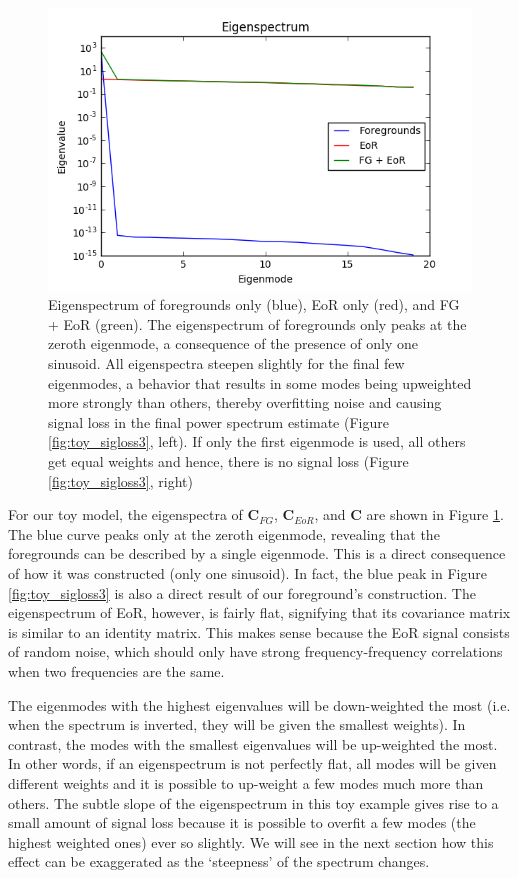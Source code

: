 \documentclass[preprint2,numberedappendix,tighten,twocolappendix]{aastex6}  %
\begin{document}
\begin{figure}
	\centering
	\includegraphics[trim={0.3cm 0.2cm 0.3cm 0.3cm},clip,width=\columnwidth]{plots/toy_sigloss2.png}
	\caption{Eigenspectrum of foregrounds only (blue), EoR only (red), and FG + EoR (green). The eigenspectrum of foregrounds only peaks at the zeroth eigenmode, a consequence of the presence of only one sinusoid. All eigenspectra steepen slightly for the final few eigenmodes, a behavior that results in some modes being upweighted more strongly than others, thereby overfitting noise and causing signal loss in the final power spectrum estimate (Figure \ref{fig:toy_sigloss3}, left). If only the first eigenmode is used, all others get equal weights and hence, there is no signal loss (Figure \ref{fig:toy_sigloss3}, right)}
	\label{fig:toy_sigloss2}
\end{figure}

For our toy model, the eigenspectra of $\textbf{C}_{FG}$, $\textbf{C}_{EoR}$, and $\textbf{C}$ are shown in Figure \ref{fig:toy_sigloss2}. The blue curve peaks only at the zeroth eigenmode, revealing that the foregrounds can be described by a single eigenmode. This is a direct consequence of how it was constructed (only one sinusoid). In fact, the blue peak in Figure \ref{fig:toy_sigloss3} is also a direct result of our foreground's construction. The eigenspectrum of EoR, however, is fairly flat, signifying that its covariance matrix is similar to an identity matrix. This makes sense because the EoR signal consists of random noise, which should only have strong frequency-frequency correlations when two frequencies are the same.

The eigenmodes with the highest eigenvalues will be down-weighted the most (i.e. when the spectrum is inverted, they will be given the smallest weights). In contrast, the modes with the smallest eigenvalues will be up-weighted the most. In other words, if an eigenspectrum is not perfectly flat, all modes will be given different weights and it is possible to up-weight a few modes much more than others. The subtle slope of the eigenspectrum in this toy example gives rise to a small amount of signal loss because it is possible to overfit a few modes (the highest weighted ones) ever so slightly. We will see in the next section how this effect can be exaggerated as the `steepness' of the spectrum changes.
\end{document}
